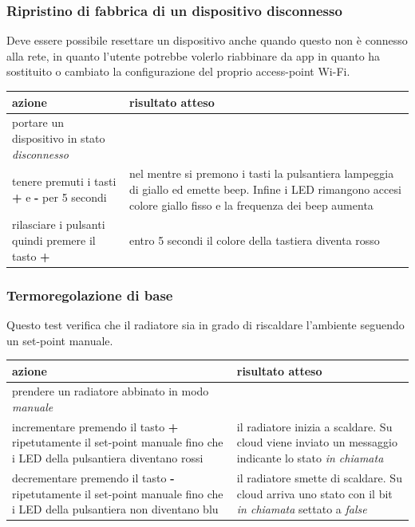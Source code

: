 \documentclass[a4paper,titlepage]{article}
\begin{document}
\subsubsection{Ripristino di fabbrica di un dispositivo disconnesso}

Deve essere possibile resettare un dispositivo anche quando questo non è connesso
alla rete, in quanto l'utente potrebbe volerlo riabbinare da app in quanto ha sostituito
o cambiato la configurazione del proprio access-point Wi-Fi.

\begin{center}
\begin{tabular}{| p{5cm} | p{5cm} |}
    \hline \textbf{azione} & \textbf{risultato atteso} \\
    \hline portare un dispositivo in stato \textit{disconnesso} & \\
    \hline tenere premuti i tasti \textbf{+} e \textbf{-} per 5 secondi & nel mentre si premono i tasti la pulsantiera lampeggia di giallo ed emette beep. Infine i LED rimangono accesi colore giallo fisso e la frequenza dei beep aumenta \\
    \hline rilasciare i pulsanti quindi premere il tasto \textbf{+} & entro 5 secondi il colore della tastiera diventa rosso \\
    \hline
\end{tabular}
\end{center}


\subsubsection{Termoregolazione di base}

Questo test verifica che il radiatore sia in grado di riscaldare l'ambiente seguendo un set-point manuale.

\begin{center}
\begin{tabular}{| p{5cm} | p{5cm} |}
    \hline \textbf{azione} & \textbf{risultato atteso} \\
    \hline prendere un radiatore abbinato in modo \textit{manuale} & \\
    \hline incrementare premendo il tasto \textbf{+} ripetutamente il set-point manuale fino che i LED della pulsantiera diventano rossi & il radiatore inizia a scaldare. Su cloud viene inviato un messaggio indicante lo stato \textit{in chiamata} \\
    \hline decrementare premendo il tasto \textbf{-} ripetutamente il set-point manuale fino che i LED della pulsantiera non diventano blu & il radiatore smette di scaldare. Su cloud arriva uno stato con il bit \textit{in chiamata} settato a \textit{false} \\
    \hline
\end{tabular}
\end{center}
\end{document}
